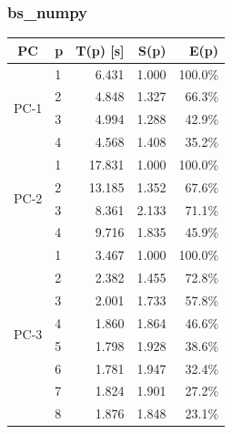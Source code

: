 \documentclass[11pt]{article}
\begin{document}
\subsubsection*{bs\_numpy}
\begin{center}
\begin{tabular}{clrrr}
\toprule
PC & p & T(p) [s] & S(p) & E(p) \\
\midrule
\multirow{4}{*}{PC-1} & 1 & 6.431 & 1.000 & 100.0\% \\
 & 2 & 4.848 & 1.327 & 66.3\% \\
 & 3 & 4.994 & 1.288 & 42.9\% \\
 & 4 & 4.568 & 1.408 & 35.2\% \\
\midrule
\multirow{4}{*}{PC-2} & 1 & 17.831 & 1.000 & 100.0\% \\
 & 2 & 13.185 & 1.352 & 67.6\% \\
 & 3 & 8.361 & 2.133 & 71.1\% \\
 & 4 & 9.716 & 1.835 & 45.9\% \\
\midrule
\multirow{8}{*}{PC-3} & 1 & 3.467 & 1.000 & 100.0\% \\
 & 2 & 2.382 & 1.455 & 72.8\% \\
 & 3 & 2.001 & 1.733 & 57.8\% \\
 & 4 & 1.860 & 1.864 & 46.6\% \\
 & 5 & 1.798 & 1.928 & 38.6\% \\
 & 6 & 1.781 & 1.947 & 32.4\% \\
 & 7 & 1.824 & 1.901 & 27.2\% \\
 & 8 & 1.876 & 1.848 & 23.1\% \\
\bottomrule
\end{tabular}
\end{center}
\end{document}
